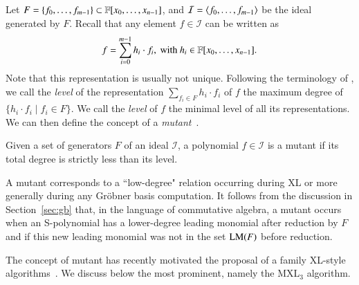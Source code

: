 Let $F = \{f_0,\ldots,f_{m-1} \} \subset {{{\mathbb F}}[x_0,\ldots,x_{n-1}]}$, and $\mathcal{I}=\langle f_0,\ldots,f_{m-1}\rangle$ be the ideal generated by $F$.
Recall that any element $f \in \mathcal{I}$ can be written as
$$f=\sum_{i=0}^{m-1}h_i \cdot f_i, \mbox{ with } h_i \in  {{{\mathbb F}}[x_0,\ldots,x_{n-1}]}.$$
Note that this representation is usually not unique. Following the terminology of \cite{mxl}, we call the {\it level} of the representation $\sum_{f_i \in F}h_i \cdot f_i$ of $f$ the maximum degree of $\{h_i \cdot f_i \mid f_i \in F\}$. We call the {\it level} of $f$ the minimal level of all its representations. We can then define the concept of a {\it mutant}~\cite{mxl,mxl2,mxl3}.
\begin{definition}
Given a set of generators $F$ of an ideal $\mathcal{I}$, a polynomial $f \in \mathcal{I}$ is a  {\rm mutant} if its total degree is strictly less than its level.       
\end{definition}
A mutant corresponds to a ``low-degree" relation occurring during XL or more generally during any Gr\"obner basis computation. 
It follows from the discussion in Section~\ref{sec:gb} that, in the language of commutative algebra, 
a mutant occurs when an S-polynomial has a lower-degree leading monomial after reduction by $F$ and if this new leading monomial was not in the set $\textsc{LM}(F)$ before reduction.

The concept of mutant has recently motivated the proposal of a family XL-style algorithms~\cite{mxl,mxl2,mxl3,mxl4}. We discuss below the most prominent, namely the MXL$_3$ algorithm.

